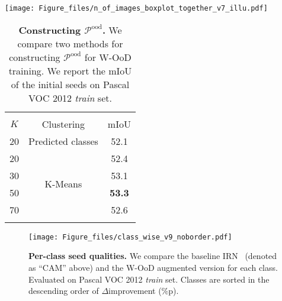 \documentclass[10pt,twocolumn,letterpaper]{article}
\begin{document}
\begin{table*}[t]
  \centering
\begin{minipage}{0.66\linewidth}
  \centering
\texttt{[image: Figure\_files/n\_of\_images\_boxplot\_together\_v7\_illu.pdf]}
  \vspace{-2em}
\end{minipage}\hfill
\begin{minipage}{0.3\linewidth}
\center
\small
{
\begin{tabular}{ccc}
\Xhline{1pt}\\[-0.95em]
    $K$     & Clustering & mIoU \\
    \hline\hline
       20   &   Predicted classes   &  52.1\\
       \hline
    20      &   \multirow{4}[0]{*}{K-Means}  & 52.4 \\
     30     &       &  53.1\\
50    &       &  \textbf{53.3}\\


    70      &      & 52.6 \\
\Xhline{1pt}
    \end{tabular}}
\caption{\textbf{Constructing $\mathcal{P}^\text{ood}$. }
      We compare two methods for constructing $\mathcal{P}^\text{ood}$ for W-OoD training. 
      We report the mIoU of the initial seeds on Pascal VOC 2012 \textit{train} set.}
  \label{table_clustering}\end{minipage}\hfill
\vspace{-1em}
\end{table*} 
\begin{figure*}[t]
\centering
\texttt{[image: Figure\_files/class\_wise\_v9\_noborder.pdf]}
\vspace{-0.7em}
\caption{\label{class_wise} \textbf{Per-class seed qualities.} We compare the baseline IRN~\cite{ahn2019weakly} (denoted as ``CAM'' above) and the W-OoD augmented version for each class. Evaluated on Pascal VOC 2012 \textit{train} set. Classes are sorted in the descending order of $\Delta$improvement (\%p).}
\vspace{-1em}
\end{figure*}
 
\end{document}
